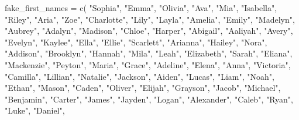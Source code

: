 \documentclass[
]{article}
\newenvironment{Shaded}{\begin{snugshade}}{\end{snugshade}}
\newcommand{\FunctionTok}[1]{\textcolor[rgb]{0.00,0.00,0.00}{#1}}
\newcommand{\NormalTok}[1]{#1}
\newcommand{\OtherTok}[1]{\textcolor[rgb]{0.56,0.35,0.01}{#1}}
\newcommand{\StringTok}[1]{\textcolor[rgb]{0.31,0.60,0.02}{#1}}
\begin{document}
\begin{Shaded}
\begin{Highlighting}[]
\NormalTok{fake\_first\_names }\OtherTok{=} \FunctionTok{c}\NormalTok{(}
  \StringTok{"Sophia"}\NormalTok{, }\StringTok{"Emma"}\NormalTok{, }\StringTok{"Olivia"}\NormalTok{, }\StringTok{"Ava"}\NormalTok{, }\StringTok{"Mia"}\NormalTok{, }\StringTok{"Isabella"}\NormalTok{, }\StringTok{"Riley"}\NormalTok{, }
  \StringTok{"Aria"}\NormalTok{, }\StringTok{"Zoe"}\NormalTok{, }\StringTok{"Charlotte"}\NormalTok{, }\StringTok{"Lily"}\NormalTok{, }\StringTok{"Layla"}\NormalTok{, }\StringTok{"Amelia"}\NormalTok{, }\StringTok{"Emily"}\NormalTok{, }
  \StringTok{"Madelyn"}\NormalTok{, }\StringTok{"Aubrey"}\NormalTok{, }\StringTok{"Adalyn"}\NormalTok{, }\StringTok{"Madison"}\NormalTok{, }\StringTok{"Chloe"}\NormalTok{, }\StringTok{"Harper"}\NormalTok{, }
  \StringTok{"Abigail"}\NormalTok{, }\StringTok{"Aaliyah"}\NormalTok{, }\StringTok{"Avery"}\NormalTok{, }\StringTok{"Evelyn"}\NormalTok{, }\StringTok{"Kaylee"}\NormalTok{, }\StringTok{"Ella"}\NormalTok{, }\StringTok{"Ellie"}\NormalTok{, }
  \StringTok{"Scarlett"}\NormalTok{, }\StringTok{"Arianna"}\NormalTok{, }\StringTok{"Hailey"}\NormalTok{, }\StringTok{"Nora"}\NormalTok{, }\StringTok{"Addison"}\NormalTok{, }\StringTok{"Brooklyn"}\NormalTok{, }
  \StringTok{"Hannah"}\NormalTok{, }\StringTok{"Mila"}\NormalTok{, }\StringTok{"Leah"}\NormalTok{, }\StringTok{"Elizabeth"}\NormalTok{, }\StringTok{"Sarah"}\NormalTok{, }\StringTok{"Eliana"}\NormalTok{, }\StringTok{"Mackenzie"}\NormalTok{, }
  \StringTok{"Peyton"}\NormalTok{, }\StringTok{"Maria"}\NormalTok{, }\StringTok{"Grace"}\NormalTok{, }\StringTok{"Adeline"}\NormalTok{, }\StringTok{"Elena"}\NormalTok{, }\StringTok{"Anna"}\NormalTok{, }\StringTok{"Victoria"}\NormalTok{, }
  \StringTok{"Camilla"}\NormalTok{, }\StringTok{"Lillian"}\NormalTok{, }\StringTok{"Natalie"}\NormalTok{, }\StringTok{"Jackson"}\NormalTok{, }\StringTok{"Aiden"}\NormalTok{, }\StringTok{"Lucas"}\NormalTok{, }
  \StringTok{"Liam"}\NormalTok{, }\StringTok{"Noah"}\NormalTok{, }\StringTok{"Ethan"}\NormalTok{, }\StringTok{"Mason"}\NormalTok{, }\StringTok{"Caden"}\NormalTok{, }\StringTok{"Oliver"}\NormalTok{, }\StringTok{"Elijah"}\NormalTok{, }
  \StringTok{"Grayson"}\NormalTok{, }\StringTok{"Jacob"}\NormalTok{, }\StringTok{"Michael"}\NormalTok{, }\StringTok{"Benjamin"}\NormalTok{, }\StringTok{"Carter"}\NormalTok{, }\StringTok{"James"}\NormalTok{, }
  \StringTok{"Jayden"}\NormalTok{, }\StringTok{"Logan"}\NormalTok{, }\StringTok{"Alexander"}\NormalTok{, }\StringTok{"Caleb"}\NormalTok{, }\StringTok{"Ryan"}\NormalTok{, }\StringTok{"Luke"}\NormalTok{, }\StringTok{"Daniel"}\NormalTok{, }

\end{Highlighting}
\end{Shaded}
\end{document}
